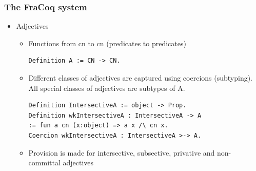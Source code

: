 \documentclass[11pt]{beamer}
\begin{document}
\begin{frame}[fragile]
	\frametitle{The FraCoq system}
	
\begin{itemize}
		
\item Adjectives


	\begin{itemize}
		
		\item Functions from cn to cn (predicates to predicates)
		
		
		\begin{verbatim}
Definition A := CN -> CN.
		\end{verbatim}	
		
\item Different classes of adjectives are captured using coercions (subtyping). All special classes of adjectives are subtypes of A. 

\begin{verbatim}
Definition IntersectiveA := object -> Prop.
Definition wkIntersectiveA : IntersectiveA -> A
:= fun a cn (x:object) => a x /\ cn x.
Coercion wkIntersectiveA : IntersectiveA >-> A.
\end{verbatim}	


\item Provision is made for intersective, subsective, privative and non-committal adjectives

\end{itemize}\end{itemize}
\end{frame}
\end{document}
